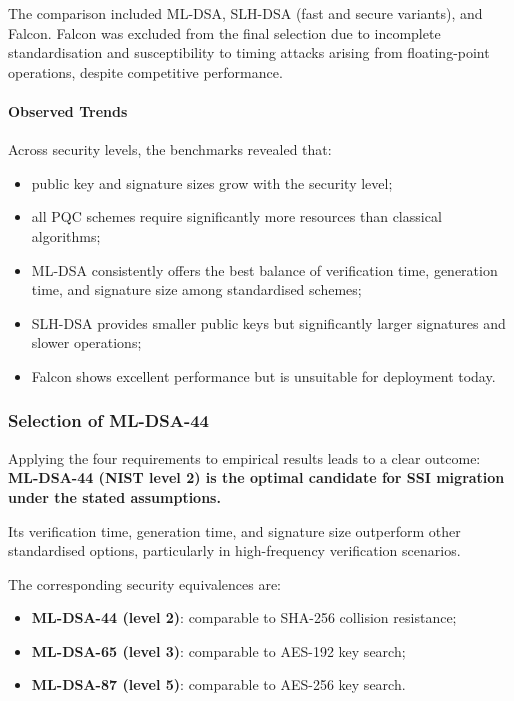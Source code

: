 \noindent
The comparison included ML-DSA, SLH-DSA (fast and secure variants), and Falcon. Falcon was excluded from the final selection due to incomplete standardisation and susceptibility to timing attacks arising from floating-point operations, despite competitive performance.

\paragraph*{Observed Trends}
Across security levels, the benchmarks revealed that:
\begin{itemize}
    \item public key and signature sizes grow with the security level;
    \item all PQC schemes require significantly more resources than classical algorithms;
    \item ML-DSA consistently offers the best balance of verification time, generation time, and signature size among standardised schemes;
    \item SLH-DSA provides smaller public keys but significantly larger signatures and slower operations;
    \item Falcon shows excellent performance but is unsuitable for deployment today.
\end{itemize}

\subsubsection*{Selection of ML-DSA-44}
Applying the four requirements to empirical results leads to a clear outcome:  
\textbf{ML-DSA-44 (NIST level 2) is the optimal candidate for SSI migration under the stated assumptions.}
\medskip

\noindent
Its verification time, generation time, and signature size outperform other standardised options, particularly in high-frequency verification scenarios.
\smallskip

\noindent
The corresponding security equivalences are:
\begin{itemize}
    \item \textbf{ML-DSA-44 (level 2)}: comparable to SHA-256 collision resistance;
    \item \textbf{ML-DSA-65 (level 3)}: comparable to AES-192 key search;
    \item \textbf{ML-DSA-87 (level 5)}: comparable to AES-256 key search.
\end{itemize}

